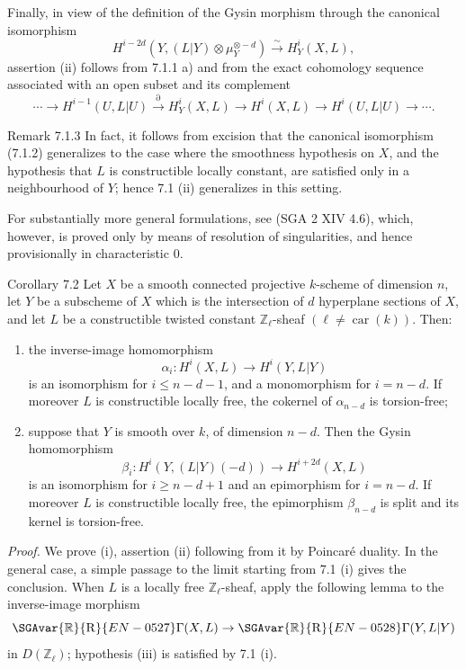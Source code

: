Finally, in view of the definition of the Gysin morphism through the canonical isomorphism
\[
H^{i-2d}(Y,(L|Y)\otimes\mu_Y^{\otimes -d})\xrightarrow{\sim} H^i_Y(X,L),
\tag{7.1.2}
\]
assertion (ii) follows from 7.1.1 a) and from the exact cohomology sequence associated with an open subset and its complement
\[
\cdots\to H^{i-1}(U,L|U)\xrightarrow{\partial}H^i_Y(X,L)\to H^i(X,L)\to H^i(U,L|U)\to\cdots .
\]

\begin{statement}{Remark 7.1.3}
In fact, it follows from excision that the canonical isomorphism (7.1.2) generalizes to the case where the smoothness hypothesis on $X$, and the hypothesis that $L$ is constructible locally constant, are satisfied only in a neighbourhood of $Y$; hence 7.1 (ii) generalizes in this setting.

For substantially more general formulations, see (SGA 2 XIV 4.6), which, however, is proved only by means of resolution of singularities, and hence provisionally in characteristic $0$.
\end{statement}

\begin{statement}{Corollary 7.2}
Let $X$ be a smooth connected projective $k$-scheme of dimension $n$, let $Y$ be a subscheme of $X$ which is the intersection of $d$ hyperplane sections of $X$, and let $L$ be a constructible twisted constant $\mathbb Z_\ell$-sheaf $(\ell\ne\operatorname{car}(k))$. Then:
\begin{enumerate}[label=(\roman*)]
\item the inverse-image homomorphism
\[
\alpha_i:H^i(X,L)\to H^i(Y,L|Y)
\]
is an isomorphism for $i\le n-d-1$, and a monomorphism for $i=n-d$. If moreover $L$ is constructible locally free, the cokernel of $\alpha_{n-d}$ is torsion-free;
\item suppose that $Y$ is smooth over $k$, of dimension $n-d$. Then the Gysin homomorphism
\[
\beta_i:H^i(Y,(L|Y)(-d))\to H^{i+2d}(X,L)
\]
is an isomorphism for $i\ge n-d+1$ and an epimorphism for $i=n-d$. If moreover $L$ is constructible locally free, the epimorphism $\beta_{n-d}$ is split and its kernel is torsion-free.
\end{enumerate}
\end{statement}

\emph{Proof.} We prove (i), assertion (ii) following from it by Poincaré duality. In the general case, a simple passage to the limit starting from 7.1 (i) gives the conclusion. When $L$ is a locally free $\mathbb Z_\ell$-sheaf, apply the following lemma to the inverse-image morphism
\[
\SGAvar{\mathbb{R}}{\mathrm{R}}{EN-0527}\Gamma(X,L)\to \SGAvar{\mathbb{R}}{\mathrm{R}}{EN-0528}\Gamma(Y,L|Y)
\]
in $D(\mathbb Z_\ell)$; hypothesis (iii) is satisfied by 7.1 (i).

